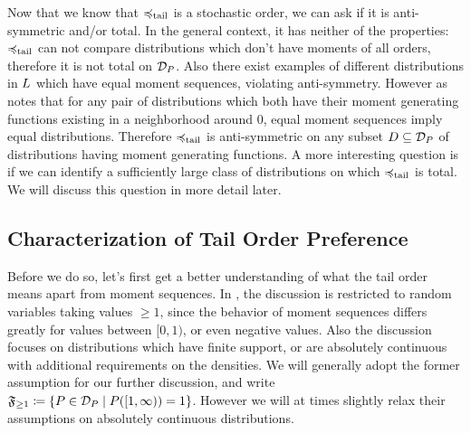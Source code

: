 \documentclass[a4paper]{scrreprt}
\begin{document}
    Now that we know that $\preccurlyeq_{\text{tail}}$ is a stochastic order, we can ask if it is anti-symmetric and/or total.
    In the general context, it has neither of the properties: $\preccurlyeq_{\text{tail}}$ can not compare distributions which don't have moments of all orders, therefore it is not total on $\mathcal{D}_P$.
    Also there exist examples of different distributions in $L$ which have equal moment sequences, violating anti-symmetry. However as \cite{bib:rassGameRiskManagI} notes that for any pair of distributions which both have their moment generating functions existing in a neighborhood around 0, equal moment sequences imply equal distributions.
    Therefore $\preccurlyeq_{\text{tail}}$ is anti-symmetric on any subset $D \subseteq \mathcal{D}_P$ of distributions having moment generating functions.
    A more interesting question is if we can identify a sufficiently large class of distributions on which $\preccurlyeq_{\text{tail}}$ is total. We will discuss this question in more detail later.
    
    \subsection{Characterization of Tail Order Preference}
    \newcommand{\Fgeq}{\mathfrak{F}_{\geq 1}} %
    Before we do so, let's first get a better understanding of what the tail order means apart from moment sequences.
    In \cite{bib:rassGameRiskManagI}, the discussion is restricted to random variables taking values $\geq 1$, since the behavior of moment sequences differs greatly for values between $[0, 1)$, or even negative values. Also the discussion focuses on distributions which have finite support, or are absolutely continuous with additional requirements on the densities. We will generally adopt the former assumption for our further discussion, and write $\Fgeq \coloneqq \set{P \in \DP \mid P([1, \infty)) = 1}$.
    However we will at times slightly relax their assumptions on absolutely continuous distributions.
    
\end{document}
